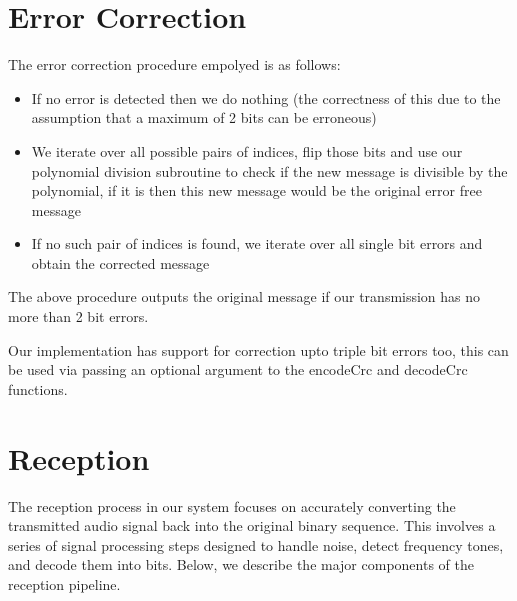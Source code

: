 \documentclass[11pt]{article}
\begin{document}
\section{Error Correction}
The error correction procedure empolyed is as follows:
\begin{itemize}
    \item If no error is detected then we do nothing (the correctness of this due to the assumption that a maximum of 2 bits can be erroneous)
    \item We iterate over all possible pairs of indices, flip those bits and use our polynomial division subroutine to check if the new message is divisible by the polynomial, if it is then this new message would be the original error free message
    \item If no such pair of indices is found, we iterate over all single bit errors and obtain the corrected message
\end{itemize}
The above procedure outputs the original message if our transmission has no more than 2 bit errors.
\begin{center}
\end{center}
\noindent Our implementation has support for correction upto triple bit errors too, this can be used via passing an optional argument to the encodeCrc and decodeCrc functions.
\section{Reception}

The reception process in our system focuses on accurately converting the transmitted audio signal back into the original binary sequence. This involves a series of signal processing steps designed to handle noise, detect frequency tones, and decode them into bits. Below, we describe the major components of the reception pipeline.
\end{document}
